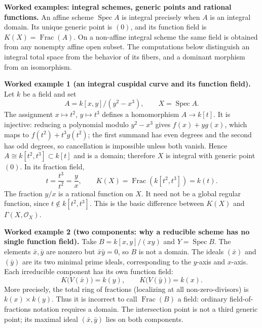 \par\medskip
\noindent\textbf{Worked examples: integral schemes, generic points and rational functions.}
An affine scheme $\operatorname{Spec}A$ is integral precisely when $A$ is an
integral domain.  Its unique generic point is $(0)$, and its function field
is $K(X)=\operatorname{Frac}(A)$.  On a non-affine integral scheme the same
field is obtained from any nonempty affine open subset.  The computations
below distinguish an integral total space from the behavior of its fibers,
and a dominant morphism from an isomorphism.

\par\medskip
\noindent\textbf{Worked example 1 (an integral cuspidal curve and its function field).}
Let $k$ be a field and set
\[
 A=k[x,y]/(y^2-x^3),\qquad X=\operatorname{Spec}A.
\]
The assignment $x\mapsto t^2$, $y\mapsto t^3$ defines a homomorphism
$A\to k[t]$.  It is injective: reducing a polynomial modulo
$y^2-x^3$ gives $f(x)+y g(x)$, which maps to
$f(t^2)+t^3g(t^2)$; the first summand has even degrees and the second
has odd degrees, so cancellation is impossible unless both vanish.
Hence $A\cong k[t^2,t^3]\subset k[t]$ and is a domain; therefore $X$
is integral with generic point $(0)$.  In its fraction field,
\[
 t=\frac{t^3}{t^2}=\frac{y}{x},\qquad
 K(X)=\operatorname{Frac}(k[t^2,t^3])=k(t).
\]
The fraction $y/x$ is a rational function on $X$.  It need not be a
global regular function, since $t\notin k[t^2,t^3]$.  This is the basic
difference between $K(X)$ and $\Gamma(X,\mathcal O_X)$.

\par\medskip
\noindent\textbf{Worked example 2 (two components: why a reducible scheme has no single function field).}
Take $B=k[x,y]/(xy)$ and $Y=\operatorname{Spec}B$.
The elements $\bar x,\bar y$ are nonzero but $\bar x\bar y=0$, so $B$
is not a domain.  The ideals $(\bar x)$ and $(\bar y)$ are its two
minimal prime ideals, corresponding to the $y$-axis and $x$-axis.
Each irreducible component has its own function field:
\[
 K\bigl(V(\bar x)\bigr)=k(y),\qquad
 K\bigl(V(\bar y)\bigr)=k(x).
\]
More precisely, the total ring of fractions (localizing at all
non-zero-divisors) is $k(x)\times k(y)$.  Thus it is incorrect to call
$\operatorname{Frac}(B)$ a field: ordinary field-of-fractions notation
requires a domain.  The intersection point is not a third generic point;
its maximal ideal $(\bar x,\bar y)$ lies on both components.


